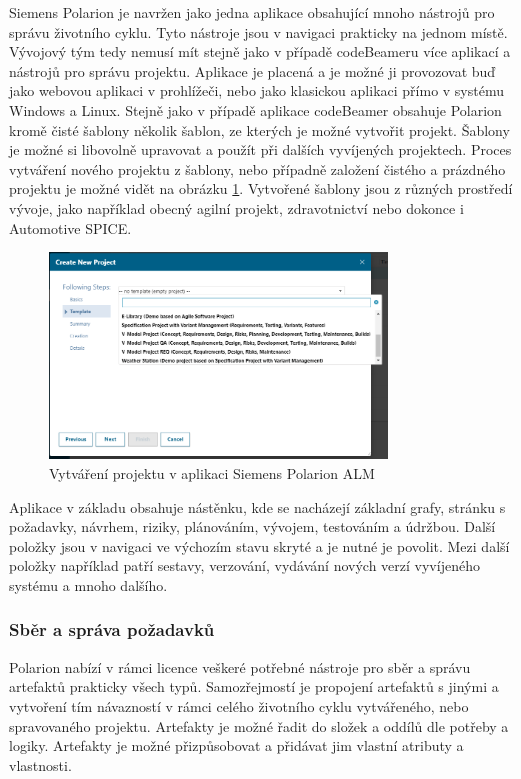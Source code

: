 \documentclass[czech,master,public,dept460,male,cpdeclaration,oneside]{diploma}
\begin{document}
Siemens Polarion je navržen jako jedna aplikace obsahující mnoho nástrojů pro správu životního cyklu. Tyto nástroje jsou v navigaci prakticky na jednom místě. Vývojový tým tedy nemusí mít stejně jako v případě codeBeameru více aplikací a nástrojů pro správu projektu. Aplikace je placená a je možné ji provozovat buď jako webovou aplikaci v prohlížeči, nebo jako klasickou aplikaci přímo v systému Windows a Linux. Stejně jako v případě aplikace codeBeamer obsahuje Polarion kromě čisté šablony několik šablon, ze kterých je možné vytvořit projekt. Šablony je možné si libovolně upravovat a použít při dalších vyvíjených projektech. Proces vytváření nového projektu z šablony, nebo případně založení čistého a prázdného projektu je možné vidět na obrázku \ref{fig:polarion_new_project}. Vytvořené šablony jsou z různých prostředí vývoje, jako například obecný agilní projekt, zdravotnictví nebo dokonce i Automotive SPICE. 


\begin{figure}[!ht]
    \centering
    \includegraphics[width=0.8\textwidth]{Diplomka/Figures/polarion_create_project.png}
    \caption{Vytváření projektu v aplikaci Siemens Polarion ALM}
    \label{fig:polarion_new_project}
\end{figure}


Aplikace v základu obsahuje nástěnku, kde se nacházejí základní grafy, stránku s požadavky, návrhem, riziky, plánováním, vývojem, testováním a údržbou. Další položky jsou v navigaci ve výchozím stavu skryté a je nutné je povolit. Mezi další položky například patří sestavy, verzování, vydávání nových verzí vyvíjeného systému a mnoho dalšího.

\subsubsection{Sběr a správa požadavků}
Polarion nabízí v rámci licence veškeré potřebné nástroje pro sběr a správu artefaktů prakticky všech typů. Samozřejmostí je propojení artefaktů s jinými a vytvoření tím návazností v rámci celého životního cyklu vytvářeného, nebo spravovaného projektu. Artefakty je možné řadit do složek a oddílů dle potřeby a logiky. Artefakty je možné přizpůsobovat a přidávat jim vlastní atributy a vlastnosti.
\end{document}
